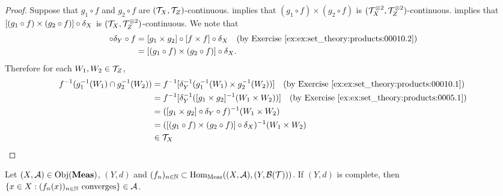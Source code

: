 \documentclass{book}
\begin{document}
	\begin{proof}
		Suppose that $g_1 \circ f$ and $g_2 \circ f$ are $(\mathcal{T}_X, \mathcal{T}_Z)$-continuous. \rex{} implies that $(g_1 \circ f) \times (g_2 \circ f)$ is $(\mathcal{T}_X^{\otimes 2}, \mathcal{T}_Z^{\otimes 2})$-continuous. \rex{}  implies that $[(g_1 \circ f) \times (g_2 \circ f)] \circ \delta_X$ is $(\mathcal{T}_X, \mathcal{T}_Z^{\otimes 2})$-continuous. We note that
		\begin{align*}
			[g_1 \times g_2] \circ \del_Y \circ f
			& = [g_1 \times g_2] \circ [f \times f] \circ \del_X \quad \text{(by \rex{ex:set_theory:products:00010.2})} \\
			& = [(g_1 \circ f) \times (g_2 \circ f)] \circ \del_X.
		\end{align*}
		Therefore for each $W_1, W_2 \in \mathcal{T}_Z$, 
		\begin{align*}
			f^{-1}(g_1^{-1}(W_1) \cap g_2^{-1}(W_2))
			& = f^{-1} [ \del_Y^{-1}(g_1^{-1}(W_1) \times g_2^{-1}(W_2))] \quad \text{(by \rex{ex:set_theory:products:00010.1})} \\
			& = f^{-1} [ \del_Y^{-1}([g_1 \times g_2]^{-1}(W_1 \times W_2))] \quad \text{(by \rex{ex:set_theory:products:0005.1})} \\
			& = ([g_1 \times g_2] \circ \del_Y \circ f)^{-1}(W_1 \times W_2) \\
			& = ([(g_1 \circ f) \times (g_2 \circ f)] \circ \del_X)^{-1}(W_1 \times W_2) \\
			& \in \MT_X
		\end{align*}
	\end{proof}
	
	\begin{ex} 
		Let $(X, \mathcal{A}) \in \operatorname{Obj}(\operatorname{\text{\textbf{Meas}}})$, $(Y, d)$  and $(f_n)_{n \in \mathbb{N}} \subset \operatorname{Hom}_{\operatorname{\text{Meas}}}((X, \mathcal{A}), (Y, \mathcal{B}(\mathcal{T})))$. If $(Y,d)$ is complete, then $\{x \in X: \text{$(f_n(x))_{n \in \mathbb{N}}$ converges} \} \in \mathcal{A}$.  
	\end{ex}
	
\end{document}
